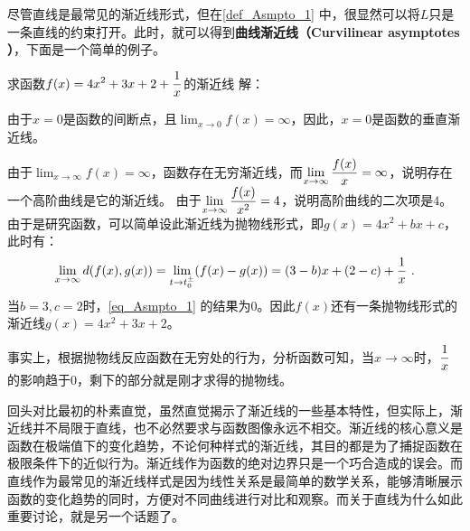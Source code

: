 尽管直线是最常见的渐近线形式，但在\autoref{def_Asmpto_1} 中，很显然可以将$L$只是一条直线的约束打开。此时，就可以得到\textbf{曲线渐近线（Curvilinear asymptotes ）}，下面是一个简单的例子。

\begin{example}{求函数$\displaystyle f(x)=4x^2+3x+2+{1\over x}$的渐近线}
解：

由于$x=0$是函数的间断点，且$\displaystyle\lim_{x\to0}f(x)=\infty$，因此，$x=0$是函数的垂直渐近线。

由于$\displaystyle\lim_{x\to\infty}f(x)=\infty$，函数存在无穷渐近线，而$\displaystyle\lim_{x\to\infty}{f(x)\over x}=\infty$，说明存在一个高阶曲线是它的渐近线。
由于$\displaystyle\lim_{x\to\infty}{f(x)\over x^2}=4$，说明高阶曲线的二次项是$4$。由于是研究函数，可以简单设此渐近线为抛物线形式，即$g(x)=4x^2+bx+c$，此时有：
\begin{equation}\label{eq_Asmpto_1}
\displaystyle\lim_{x \to \infty} d(f(x), g(x)) =\displaystyle\lim_{t \to t^\pm_0} (f(x)-g(x))=(3-b)x+(2-c)+{1\over x}~.
\end{equation}
当$b=3,c=2$时，\autoref{eq_Asmpto_1} 的结果为$0$。因此$f(x)$还有一条抛物线形式的渐近线$g(x)=4x^2+3x+2$。

事实上，根据抛物线反应函数在无穷处的行为，分析函数可知，当$x\to\infty$时，$\displaystyle{1\over x}$的影响趋于$0$，剩下的部分就是刚才求得的抛物线。
\end{example}

回头对比最初的朴素直觉，虽然直觉揭示了渐近线的一些基本特性，但实际上，渐近线并不局限于直线，也不必然要求与函数图像永远不相交。渐近线的核心意义是函数在极端值下的变化趋势，不论何种样式的渐近线，其目的都是为了捕捉函数在极限条件下的近似行为。渐近线作为函数的绝对边界只是一个巧合造成的误会。而直线作为最常见的渐近线样式是因为线性关系是最简单的数学关系，能够清晰展示函数的变化趋势的同时，方便对不同曲线进行对比和观察。而关于直线为什么如此重要讨论，就是另一个话题了。